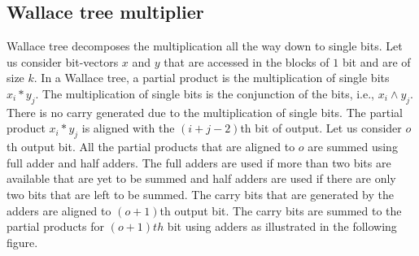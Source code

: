 \subsection{Wallace tree multiplier\cite{wallace}}
%
Wallace tree decomposes the multiplication all the way down to single bits.
%
Let us consider bit-vectors $x$ and $y$ that are accessed in the blocks of $1$
bit and are of size $k$.
%
In a Wallace tree, a partial product is the multiplication of single
bits $x_i*y_j$.
%
The multiplication of single bits is the conjunction of the bits, i.e.,
$x_i \land y_j$.
%
There is no carry generated due to the multiplication of single bits.
%
The partial product $x_i*y_j$ is aligned with the $(i+j-2)$th bit of output.
%
Let us consider $o$th output bit.
%
All the partial products that are aligned to $o$ are summed using full adder 
and half adders.
%
The full adders are used
if more than two bits are available that are yet to be summed
and half adders are used if there are only two bits that are left to be summed.
%
The carry bits that are generated by the adders are aligned to
$(o+1)$th output bit.
%
The carry bits are summed to the partial products for $(o+1)th$ bit
using adders as illustrated in the following figure.

\begin{center}
\end{center}

